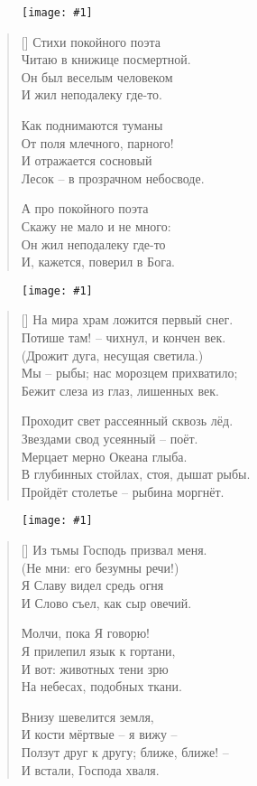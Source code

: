 \documentclass[12pt,a5paper,twoside]{article}
\newcommand{\pict}[1]{\thispagestyle{empty}\begin{figure}[H]\begin{center}\texttt{[image: \#1]}\end{center}\end{figure}\newpage}
\begin{document}
\pict{picts/stixi_pokoynogo_poeta1.png} 


\settowidth{\versewidth}{Стихи покойного поэта}
\begin{verse}[\versewidth]
Стихи покойного поэта\\
Читаю в книжице посмертной.\\
Он был веселым человеком\\
И жил неподалеку где-то.

Как поднимаются туманы\\
От поля млечного, парного!\\
И отражается сосновый\\
Лесок – в прозрачном небосводе.

А про покойного поэта\\
Скажу не мало и не много:\\
Он жил неподалеку где-то\\
И, кажется, поверил в Бога.
\end{verse}

\newpage

\pict{picts/Na_mira_xram.png} 


\settowidth{\versewidth}{На мира храм ложится первый снег.}
\begin{verse}[\versewidth]
На мира храм ложится первый снег.\\
Потише там! – чихнул, и кончен век.\\
(Дрожит дуга, несущая светила.)\\
Мы – рыбы; нас морозцем прихватило;\\
Бежит слеза из глаз, лишенных век.

Проходит свет рассеянный сквозь лёд.\\
Звездами свод усеянный – поёт.\\
Мерцает мерно Океана глыба.\\
В глубинных стойлах, стоя, дышат рыбы.\\
Пройдёт столетье – рыбина моргнёт.
\end{verse}
\newpage

\pict{picts/Iz_tmy_gospod.png} 


\settowidth{\versewidth}{Из тьмы Господь призвал меня.}
\begin{verse}[\versewidth]
Из тьмы Господь призвал меня.\\
(Не мни: его безумны речи!)\\
Я Славу видел средь огня\\
И Слово съел, как сыр овечий.

Молчи, пока Я говорю!\\
Я прилепил язык к гортани,\\
И вот: животных тени зрю\\
На небесах, подобных ткани.

Внизу шевелится земля,\\
И кости мёртвые – я вижу –\\
Ползут друг к другу; ближе, ближе! –\\
И встали, Господа хваля.
\end{verse}
\newpage
\end{document}
